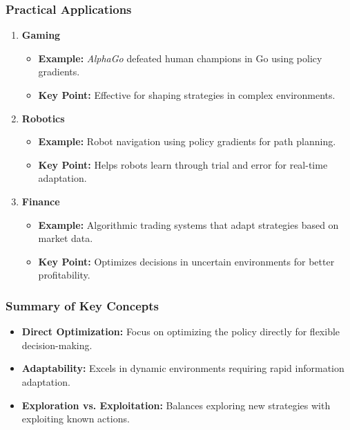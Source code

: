 \documentclass{beamer}
\begin{document}
\begin{frame}[fragile]
    \frametitle{Practical Applications}
    \begin{enumerate}
        \item \textbf{Gaming}  
        \begin{itemize}
            \item \textbf{Example:} \textit{AlphaGo} defeated human champions in Go using policy gradients.
            \item \textbf{Key Point:} Effective for shaping strategies in complex environments.
        \end{itemize}
        
        \item \textbf{Robotics}  
        \begin{itemize}
            \item \textbf{Example:} Robot navigation using policy gradients for path planning.
            \item \textbf{Key Point:} Helps robots learn through trial and error for real-time adaptation.
        \end{itemize}
        
        \item \textbf{Finance}  
        \begin{itemize}
            \item \textbf{Example:} Algorithmic trading systems that adapt strategies based on market data.
            \item \textbf{Key Point:} Optimizes decisions in uncertain environments for better profitability.
        \end{itemize}
    \end{enumerate}
\end{frame}

\begin{frame}[fragile]
    \frametitle{Summary of Key Concepts}
    \begin{itemize}
        \item \textbf{Direct Optimization:} Focus on optimizing the policy directly for flexible decision-making.
        \item \textbf{Adaptability:} Excels in dynamic environments requiring rapid information adaptation.
        \item \textbf{Exploration vs. Exploitation:} Balances exploring new strategies with exploiting known actions.
    \end{itemize}
\end{frame}
\end{document}
